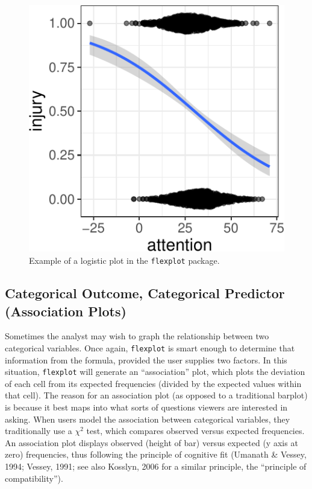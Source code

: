 \documentclass[
  english,
  man]{apa6}
\begin{document}
\begin{figure}
\centering
\includegraphics{flexplot_psychmeth_files/figure-latex/logistic-1.pdf}
\caption{\label{fig:logistic}Example of a logistic plot in the \texttt{flexplot} package.\label{fig:logistic}}
\end{figure}

\normalsize

\hypertarget{categorical-outcome-categorical-predictor-association-plots}{%
\subsection{Categorical Outcome, Categorical Predictor (Association Plots)}\label{categorical-outcome-categorical-predictor-association-plots}}

Sometimes the analyst may wish to graph the relationship between two categorical variables. Once again, \texttt{flexplot} is smart enough to determine that information from the formula, provided the user supplies two factors. In this situation, \texttt{flexplot} will generate an ``association'' plot, which plots the deviation of each cell from its expected frequencies (divided by the expected values within that cell). The reason for an association plot (as opposed to a traditional barplot) is because it best maps into what sorts of questions viewers are interested in asking. When users model the association between categorical variables, they traditionally use a \(\chi^2\) test, which compares observed versus expected frequencies. An association plot displays observed (height of bar) versus expected (y axis at zero) frequencies, thus following the principle of cognitive fit (Umanath \& Vessey, 1994; Vessey, 1991; see also Kosslyn, 2006 for a similar principle, the {``principle of compatibility''}).
\end{document}
